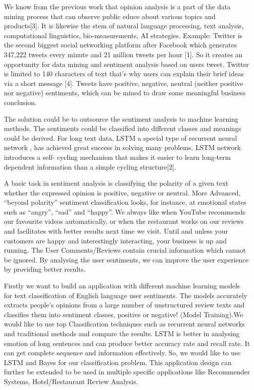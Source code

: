 \documentclass[sigplan,screen]{acmart}
\begin{document}
                       
We know from the previous work that opinion analysis is a part of the data mining process that can observe public educe about various topics and products[3]. It is likewise the stem of natural language processing, text analysis, computational linguistics, bio-measurements, AI strategies. Example: Twitter is the second biggest social networking platform after Facebook which generates 347,222 tweets every minute and 21 million tweets per hour [1]. So it creates an opportunity for data mining and sentiment analysis based on users tweet. Twitter is limited to 140 characters of text that’s why users can explain their brief ideas via a short message [4]. Tweets have positive, negative, neutral (neither positive nor negative) sentiments, which can be mined to draw some meaningful business conclusion.


The solution could be to outsource the sentiment analysis to machine learning methods. The sentiments could be classified into different classes and meanings could be derived. For long text data, LSTM a special type of recurrent neural network , has achieved great success in solving many problems. LSTM network introduces a self- cycling mechanism that makes it easier to learn long-term dependent information than a simple cycling structure[2]. 


A basic task in sentiment analysis is classifying the polarity of a given text whether the expressed opinion is positive, negative or neutral. More Advanced, “beyond polarity” sentiment classification looks, for instance, at emotional states such as “angry”, “sad” and “happy”. We always like when YouTube recommends our favourite videos automatically, or when the restaurant works on our reviews and facilitates with better results next time we visit. Until and unless your customers are happy and interestingly interacting, your business is up and running. The User Comments/Reviews contain crucial information which cannot be ignored. By analysing the user sentiments, we can improve the user experience by providing better results.


Firstly we want to build an application with different machine learning models for text classification of English language user sentiments. The models accurately extracts people’s opinions from a large number of unstructured review texts and classifies them into sentiment classes, positive or negative! (Model Training).We would like to use top Classification techniques such as recurrent neural networks and traditional methods and compare the results. LSTM is better in analysing emotion of long sentences and can produce better accuracy rate and recall rate. It can get complete sequence and information effectively. So, we would like to use LSTM and Bayes for our classification problem. This application design can further be extended to be used in multiple specific applications like Recommender Systems, Hotel/Restaurant Review Analysis. 
\end{document}

